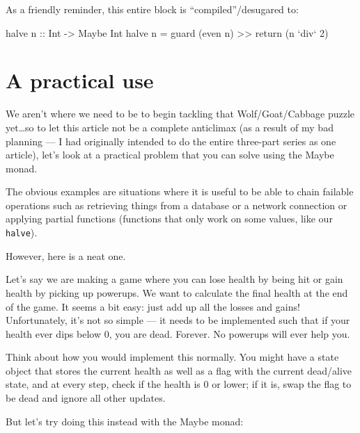 \documentclass[]{article}
\newenvironment{Shaded}{}{}
\newcommand{\DataTypeTok}[1]{\textcolor[rgb]{0.56,0.13,0.00}{{#1}}}
\newcommand{\DecValTok}[1]{\textcolor[rgb]{0.25,0.63,0.44}{{#1}}}
\newcommand{\OtherTok}[1]{\textcolor[rgb]{0.00,0.44,0.13}{{#1}}}
\newcommand{\FunctionTok}[1]{\textcolor[rgb]{0.02,0.16,0.49}{{#1}}}
\newcommand{\NormalTok}[1]{{#1}}
\begin{document}
As a friendly reminder, this entire block is ``compiled''/desugared to:

\begin{Shaded}
\begin{Highlighting}[]
\NormalTok{halve}\OtherTok{ n ::} \DataTypeTok{Int} \OtherTok{->} \DataTypeTok{Maybe} \DataTypeTok{Int}
\NormalTok{halve n }\FunctionTok{=} \NormalTok{guard (even n) }\FunctionTok{>>} \NormalTok{return (n }\OtherTok{`div`} \DecValTok{2}\NormalTok{)}
\end{Highlighting}
\end{Shaded}

\section{A practical use}\label{a-practical-use}

We aren't where we need to be to begin tackling that Wolf/Goat/Cabbage puzzle yet\ldots{}so to let
this article not be a complete anticlimax (as a result of my bad planning --- I had originally
intended to do the entire three-part series as one article), let's look at a practical problem that
you can solve using the Maybe monad.

The obvious examples are situations where it is useful to be able to chain failable operations such
as retrieving things from a database or a network connection or applying partial functions
(functions that only work on some values, like our \texttt{halve}).

However, here is a neat one.

Let's say we are making a game where you can lose health by being hit or gain health by picking up
powerups. We want to calculate the final health at the end of the game. It seems a bit easy: just
add up all the losses and gains! Unfortunately, it's not so simple --- it needs to be implemented
such that if your health ever dips below 0, you are dead. Forever. No powerups will ever help you.

Think about how you would implement this normally. You might have a state object that stores the
current health as well as a flag with the current dead/alive state, and at every step, check if the
health is 0 or lower; if it is, swap the flag to be dead and ignore all other updates.

But let's try doing this instead with the Maybe monad:
\end{document}
